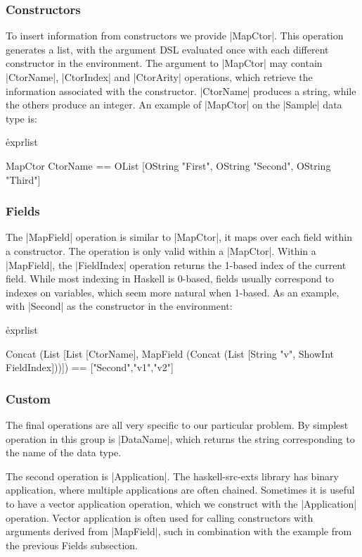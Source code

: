 \documentclass[preprint,draft]{sigplanconf}
\begin{document}
\subsubsection{Constructors}

To insert information from constructors we provide |MapCtor|. This operation generates a list, with the argument DSL evaluated once with each different constructor in the environment. The argument to |MapCtor| may contain |CtorName|, |CtorIndex| and |CtorArity| operations, which retrieve the information associated with the constructor. |CtorName| produces a string, while the others produce an integer. An example of |MapCtor| on the |Sample| data type is:

\h{exprlist}\begin{code}
MapCtor CtorName == OList
    [OString "First", OString "Second", OString "Third"]
\end{code}

\subsubsection{Fields}

The |MapField| operation is similar to |MapCtor|, it maps over each field within a constructor. The operation is only valid within a |MapCtor|. Within a |MapField|, the |FieldIndex| operation returns the 1-based index of the current field. While most indexing in Haskell is 0-based, fields usually correspond to indexes on variables, which seem more natural when 1-based. As an example, with |Second| as the constructor in the environment:

\h{exprlist}\begin{code}
Concat (List [List [CtorName],
    MapField (Concat (List [String "v", ShowInt FieldIndex]))])
    == ["Second","v1","v2"]
\end{code}

\subsubsection{Custom}

The final operations are all very specific to our particular problem. By simplest operation in this group is |DataName|, which returns the string corresponding to the name of the data type.

The second operation is |Application|. The haskell-src-exts library has binary application, where multiple applications are often chained. Sometimes it is useful to have a vector application operation, which we construct with the |Application| operation. Vector application is often used for calling constructors with arguments derived from |MapField|, such in combination with the example from the previous Fields subsection.
\end{document}
